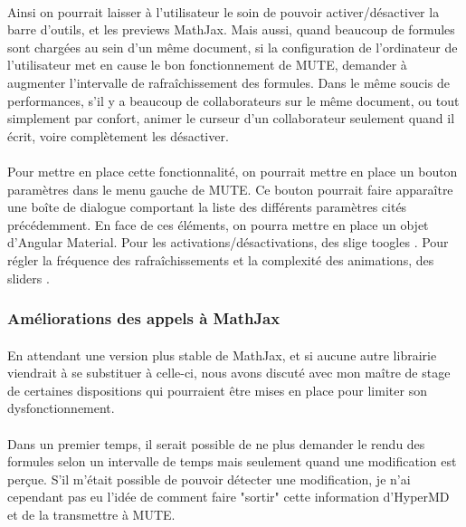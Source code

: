 \documentclass[12pt]{article}
\begin{document}
\paragraph{}
Ainsi on pourrait laisser à l'utilisateur le soin de pouvoir activer/désactiver la barre d'outils, et les previews MathJax. Mais aussi, quand beaucoup de formules sont chargées au sein d'un même document, si la configuration de l'ordinateur de l'utilisateur met en cause le bon fonctionnement de MUTE, demander à augmenter l'intervalle de rafraîchissement des formules. Dans le même soucis de performances, s'il y a beaucoup de collaborateurs sur le même document, ou tout simplement par confort, animer le curseur d'un collaborateur seulement quand il écrit, voire complètement les désactiver.
\paragraph{}
Pour mettre en place cette fonctionnalité, on pourrait mettre en place un bouton paramètres dans le menu gauche de MUTE. Ce bouton pourrait faire apparaître une boîte de dialogue comportant la liste des différents paramètres cités précédemment. En face de ces éléments, on pourra mettre en place un objet d'Angular Material. Pour les activations/désactivations, des slige toogles \cite{slide}. Pour régler la fréquence des rafraîchissements et la complexité des animations, des sliders \cite{slider}.\\

\subsubsection{Améliorations des appels à MathJax}
\paragraph{}
En attendant une version plus stable de MathJax, et si aucune autre librairie viendrait à se substituer à celle-ci, nous avons discuté avec mon maître de stage de certaines dispositions qui pourraient être mises en place pour limiter son dysfonctionnement.
\paragraph{}
Dans un premier temps, il serait possible de ne plus demander le rendu des formules selon un intervalle de temps mais seulement quand une modification est perçue. S'il m'était possible de pouvoir détecter une modification, je n'ai cependant pas eu l'idée de comment faire "sortir" cette information d'HyperMD et de la transmettre à MUTE.
\end{document}
